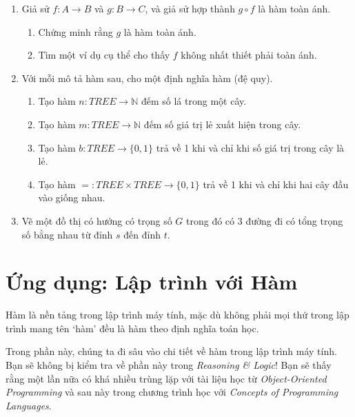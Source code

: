 \begin{enumerate}
\item[\dag 7.] Giả sử $f\colon A \to B$ và $g\colon B \to C$, và giả sử hợp thành $g \circ f$ là hàm toàn ánh.
\begin{enumerate}[label=\alph*)]
\item Chứng minh rằng $g$ là hàm toàn ánh.
\item Tìm một ví dụ cụ thể cho thấy $f$ không nhất thiết phải toàn ánh.
\end{enumerate}

\item[8.] Với mỗi mô tả hàm sau, cho một định nghĩa hàm (đệ quy).
\begin{enumerate}[label=\alph*)]
\item Tạo hàm $n\colon \mathit{TREE} \to \mathbb{N}$ đếm số lá trong một cây.
\item Tạo hàm $m\colon \mathit{TREE} \to \mathbb{N}$ đếm số giá trị lẻ xuất hiện trong cây.
\item Tạo hàm $b\colon \mathit{TREE} \to \{0,1\}$ trả về 1 khi và chỉ khi số giá trị trong cây là lẻ.
\item Tạo hàm $=\colon \mathit{TREE} \times \mathit{TREE} \to \{0,1\}$ trả về 1 khi và chỉ khi hai cây đầu vào giống nhau.
\end{enumerate}

\item[9.] Vẽ một đồ thị có hướng có trọng số $G$ trong đó có 3 đường đi có tổng trọng số bằng nhau từ đỉnh $s$ đến đỉnh $t$.
\end{enumerate}

\section{Ứng dụng: Lập trình với Hàm}

Hàm là nền tảng trong lập trình máy tính, mặc dù không phải mọi thứ trong lập trình mang tên `hàm' đều là hàm theo định nghĩa toán học.

\begin{warningbox}
Trong phần này, chúng ta đi sâu vào chi tiết về hàm trong lập trình máy tính. Bạn sẽ không bị kiểm tra về phần này trong \emph{Reasoning \& Logic}! Bạn sẽ thấy rằng một lần nữa có khá nhiều trùng lặp với tài liệu học từ \emph{Object-Oriented Programming} và sau này trong chương trình học với \emph{Concepts of Programming Languages}.
\end{warningbox}


